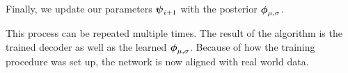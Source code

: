 Finally, we update our parameters $\boldsymbol{\psi}_{i+1}$ with the posterior $\boldsymbol{\phi}_{\mu, \sigma}$.

This process can be repeated multiple times. The result of the \dettostoc{} algorithm is the trained decoder as well as the learned $\boldsymbol{\phi}_{\mu, \sigma}$. Because of how the training procedure was set up, the network is now aligned with real world data.


